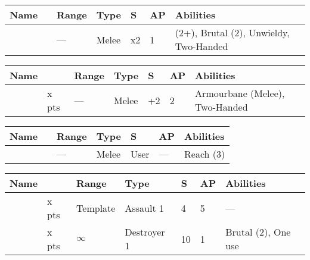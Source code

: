  \label{Voidscythe}
\noindent
\begin{tabular}{||m{110pt} m{30pt} m{31pt} m{55pt} m{12pt} m{12pt} m{210pt}||}
	\hline
	Name & & Range & Type & S & AP & Abilities \\
	\hline
	\quickref{Voidscythe} &  & — & Melee & x2 & 1 & \quickref{Entropic Strike} (2+), Brutal (2), Unwieldy, Two-Handed \\
	\hline
\end{tabular}

\label{Warscythe}
\noindent
\begin{tabular}{||m{110pt} m{30pt} m{31pt} m{55pt} m{12pt} m{12pt} m{210pt}||}
	\hline
	Name & & Range & Type & S & AP & Abilities \\
	\hline
	\quickref{Warscythe} & x pts& — & Melee & +2 & 2 & Armourbane (Melee), Two-Handed \\
	\hline
\end{tabular}

\label{Whip Coils}
\noindent
\begin{tabular}{||m{110pt} m{30pt} m{31pt} m{55pt} m{12pt} m{12pt} m{210pt}||}
	\hline
	Name & & Range & Type & S & AP & Abilities \\
	\hline
	\quickref{Whip Coils} & & — & Melee & User & — & Reach (3) \\
	\hline
\end{tabular}



 \label{Ranged Weapons}


\label{Gauntlet of Fire} \label{Tachyon Arrow}
\noindent
\begin{tabular}{||m{110pt} m{30pt} m{31pt} m{55pt} m{12pt} m{12pt} m{210pt}||}
	\hline
	Name & & Range & Type & S & AP & Abilities \\
	\hline
	\quickref{Gauntlet of Fire} & x pts& Template & Assault 1 & 4 & 5 & — \\
	\quickref{Tachyon Arrow} & x pts& $\infty$ & Destroyer 1 & 10 & 1 & Brutal (2), One use \\
	\hline
\end{tabular}




